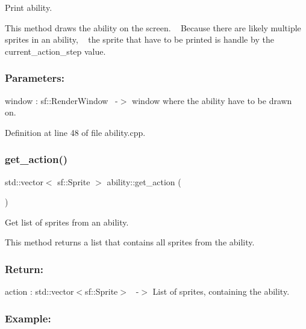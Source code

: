 Print ability. 

This method draws the ability on the screen. ~\newline
Because there are likely multiple sprites in an ability, ~\newline
the sprite that have to be printed is handle by the current\+\_\+action\+\_\+step value. ~\newline


\subsubsection*{Parameters\+: }

window \+: sf\+::\+Render\+Window~\newline
-\/$>$ window where the ability have to be drawn on.~\newline


Definition at line 48 of file ability.\+cpp.

\mbox{\label{classability_adeb10a7af2d372637d56395792ac918f}} 
\subsubsection{\texorpdfstring{get\+\_\+action()}{get\_action()}}
{\footnotesize\ttfamily std\+::vector$<$ sf\+::\+Sprite $>$ ability\+::get\+\_\+action (\begin{DoxyParamCaption}{ }\end{DoxyParamCaption})}



Get list of sprites from an ability. 

This method returns a list that contains all sprites from the ability. ~\newline


\subsubsection*{Return\+: }

action \+: std\+::vector$<$sf\+::\+Sprite$>$~\newline
-\/$>$ List of sprites, containing the ability.

\subsubsection*{Example\+: }

